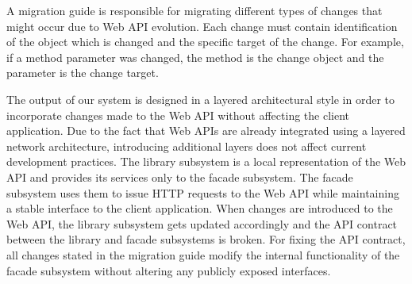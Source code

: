 A migration guide is responsible for migrating different types of changes that might occur due to Web API evolution. Each change must contain identification of the object which is changed and the specific target of the change. For example, if a method parameter was changed, the method is the change object and the parameter is the change target.

\begin{figure}[!h]
\end{figure}

The output of our system is designed in a layered architectural style in order to incorporate changes made to the Web API without affecting the client application. Due to the fact that Web APIs are already integrated using a layered network architecture, introducing additional layers does not affect current development practices. The library subsystem is a local representation of the Web API and provides its services only to the facade subsystem. The facade subsystem uses them to issue HTTP requests to the Web API while maintaining a stable interface to the client application. When changes are introduced to the Web API, the library subsystem gets updated accordingly and the API contract between the library and facade subsystems is broken. For fixing the API contract, all changes stated in the migration guide modify the internal functionality of the facade subsystem without altering any publicly exposed interfaces. 

